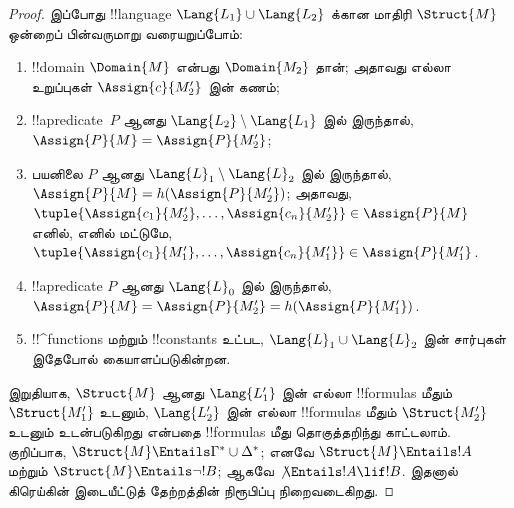 \documentclass[../../../include/open-logic-section]{subfiles}
\begin{document}
\begin{proof}
இப்போது !!{language} $\Lang{L_1} \cup \Lang{L_2}$ க்கான மாதிரி
$\Struct{M}$ ஒன்றைப் பின்வருமாறு வரையறுப்போம்:
\begin{enumerate}
\item !!{domain} $\Domain{M}$ என்பது $\Domain{M_2}$ தான்; அதாவது
  எல்லா உறுப்புகள் $\Assign{c}{M'_2}$ இன் கணம்;
\item !!a{predicate}~$P$ ஆனது $\Lang{L_2} \setminus
  \Lang{L_1}$ இல் இருந்தால், $\Assign{P}{M} = \Assign{P}{M'_2}$;
\item பயனிலை $P$ ஆனது $\Lang{L}_1\setminus \Lang{L}_2$ இல் இருந்தால்,
  $\Assign{P}{M} = h(\Assign{P}{M'_2})$; அதாவது,
  $\tuple{\Assign{c_1}{M'_2}, \dots, \Assign{c_n}{M'_2}} \in
  \Assign{P}{M}$ எனில், எனில் மட்டுமே,
  $\tuple{\Assign{c_1}{M'_1}, \dots,
  \Assign{c_n}{M'_1}} \in \Assign{P}{M'_1}$.
\item !!a{predicate} $P$ ஆனது $\Lang{L}_0$ இல் இருந்தால்,
  $\Assign{P}{M} =
  \Assign{P}{M'_2} = h(\Assign{P}{M'_1})$.
\item !!^{function}s மற்றும் !!{constant}s உட்பட,
  $\Lang{L}_1 \cup \Lang{L}_2$ இன் சார்புகள் இதேபோல் கையாளப்படுகின்றன.
\end{enumerate}

இறுதியாக, $\Struct{M}$ ஆனது $\Lang{L'_1}$ இன் எல்லா !!{formula}s
மீதும் $\Struct{M'_1}$ உடனும், $\Lang{L'_2}$ இன் எல்லா !!{formula}s
மீதும் $\Struct{M'_2}$ உடனும் உடன்படுகிறது என்பதை !!{formula}s மீது
தொகுத்தறிந்து காட்டலாம். குறிப்பாக,
$\Struct{M} \Entails \Gamma^* \cup \Delta^*$; எனவே $\Struct{M}
\Entails !A$ மற்றும் $\Struct{M} \Entails \lnot!B$; ஆகவே
$\not\Entails !A \lif !B$. இதனால் கிரெய்கின் இடையீட்டுத் தேற்றத்தின்
நிரூபிப்பு நிறைவடைகிறது.
\end{proof}
\end{document}
